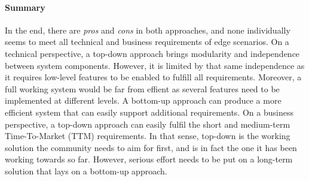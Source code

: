 

\paragraph{Summary}
In the end, there are \emph{pros} and \emph{cons} in both approaches, and none individually seems to meet all technical and business requirements of edge scenarios.
On a technical perspective, a top-down approach brings modularity and independence between system components. However, it is limited by that same independence as it requires low-level features to be enabled to fulfill all requirements. Moreover, a full working system would be far from effient as several features need to be implemented at different levels.
A bottom-up approach can produce a more efficient system that can easily support additional requirements.
On a business perspective, a top-down approach can easily fulfil the short and medium-term Time-To-Market (TTM) requirements. In that sense, top-down is the working solution the community needs to aim for first, and is in fact the one it has been working towards so far. However, serious effort needs to be put on a long-term solution that lays on a bottom-up approach.



